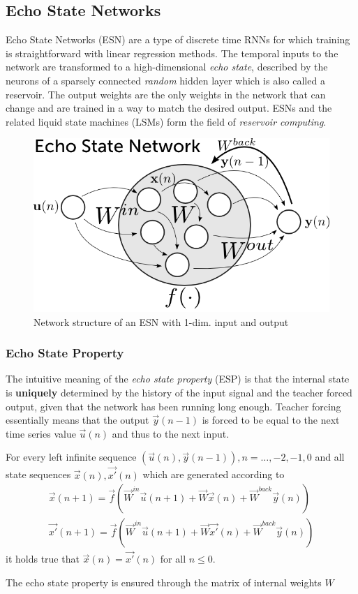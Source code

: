 \subsection*{Echo State Networks}
Echo State Networks (ESN) are a type of discrete time RNNs for which training is straightforward with linear regression methods.  The temporal inputs to the network are transformed to a high-dimensional \emph{echo state}, described by the neurons of a sparsely connected \emph{random} hidden layer which is also called a reservoir. The output weights are the only weights in the network that can change and are trained in a way to match the desired output. ESNs and the related liquid state machines (LSMs) form the field of \emph{reservoir computing}.

\begin{figure}
    \centering
    \includegraphics[width=.6\textwidth]{img/ESN_prezi.png}
    \caption{Network structure of an ESN with 1-dim. input and output}
\end{figure}

\subsubsection{Echo State Property}
The intuitive meaning of the \emph{echo state property} (ESP) is that the internal state is \textbf{uniquely} determined by the history of the input signal and the teacher forced output, given that the network has been running long enough. Teacher forcing essentially means that the output $\vec{y}(n-1)$ is forced to be equal to the next time series value $\vec{u}(n)$ and thus to the next input.
\begin{frm-def}
For every left infinite sequence $(\vec{u}(n),\vec{y}(n-1)),n=\dots,-2,-1,0$ and all state sequences $\vec{x}(n),\vec{x'}(n)$ which are generated according to
\begin{align*}
	\vec{x}(n+1)=\vec{f}(\vec{W}^{in}\vec{u}(n+1)+\vec{W}\vec{x}(n)+\vec{W}^{back}\vec{y}(n))\\
	\vec{x'}(n+1)=\vec{f}(\vec{W}^{in}\vec{u}(n+1)+\vec{W}\vec{x'}(n)+\vec{W}^{back}\vec{y}(n))
\end{align*}
it holds true that $\vec{x}(n)=\vec{x'}(n)$ for all $n \leq 0$.
\end{frm-def}
The echo state property is ensured through the matrix of internal weights $W$


